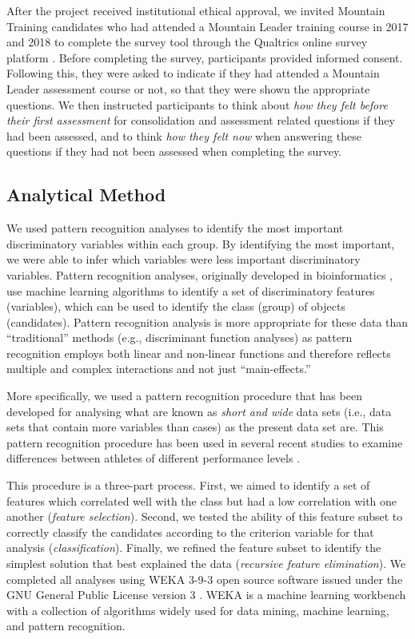 \documentclass[
  12pt,
  a4paper,
]{book}
\begin{document}
After the project received institutional ethical approval, we invited Mountain Training candidates who had attended a Mountain Leader training course in 2017 and 2018 to complete the survey tool through the Qualtrics online survey platform \citep{Qualtrics}. Before completing the survey, participants provided informed consent. Following this, they were asked to indicate if they had attended a Mountain Leader assessment course or not, so that they were shown the appropriate questions. We then instructed participants to think about \emph{how they felt before their first assessment} for consolidation and assessment related questions if they had been assessed, and to think \emph{how they felt now} when answering these questions if they had not been assessed when completing the survey.

\hypertarget{pra-analytical-method}{%
\subsection{Analytical Method}\label{pra-analytical-method}}

We used pattern recognition analyses to identify the most important discriminatory variables within each group. By identifying the most important, we were able to infer which variables were less important discriminatory variables. Pattern recognition analyses, originally developed in bioinformatics \citep{Duda2000}, use machine learning algorithms to identify a set of discriminatory features (variables), which can be used to identify the class (group) of objects (candidates). Pattern recognition analysis is more appropriate for these data than ``traditional'' methods (e.g., discriminant function analyses) as pattern recognition employs both linear and non-linear functions and therefore reflects multiple and complex interactions and not just ``main-effects.''

More specifically, we used a pattern recognition procedure that has been developed for analysing what are known as \emph{short and wide} data sets (i.e., data sets that contain more variables than cases) as the present data set are. This pattern recognition procedure has been used in several recent studies to examine differences between athletes of different performance levels \citep[e.g.,][]{Gullich2019, Jones2019a, Jones2019b, Jones2020}.

This procedure is a three-part process. First, we aimed to identify a set of features which correlated well with the class but had a low correlation with one another (\emph{feature selection}). Second, we tested the ability of this feature subset to correctly classify the candidates according to the criterion variable for that analysis (\emph{classification}). Finally, we refined the feature subset to identify the simplest solution that best explained the data (\emph{recursive feature elimination}). We completed all analyses using WEKA 3-9-3 open source software issued under the GNU General Public License version 3 \citep{Bouckaert2018, Frank2016}. WEKA is a machine learning workbench with a collection of algorithms widely used for data mining, machine learning, and pattern recognition.
\end{document}
